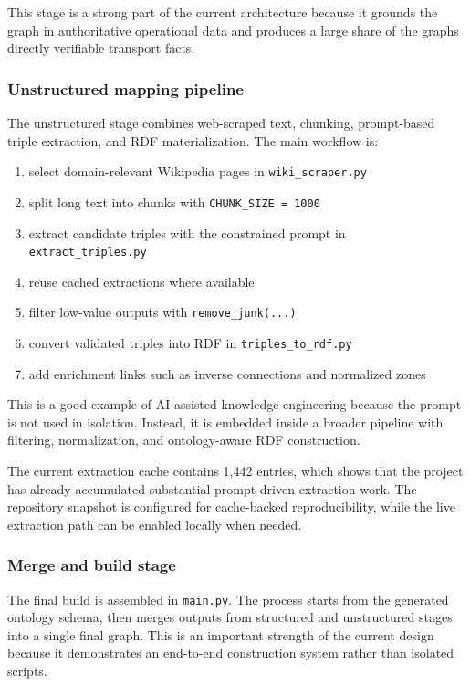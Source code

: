 \documentclass[
  11pt,
  a4paper,
]{article}
\providecommand{\tightlist}{%
  \setlength{\itemsep}{0pt}\setlength{\parskip}{0pt}}
\begin{document}
This stage is a strong part of the current architecture because it
grounds the graph in authoritative operational data and produces a large
share of the graph\textquotesingle s directly verifiable transport
facts.

\subsubsection{Unstructured mapping
pipeline}\label{unstructured-mapping-pipeline}

The unstructured stage combines web-scraped text, chunking, prompt-based
triple extraction, and RDF materialization. The main workflow is:

\begin{enumerate}
\def\labelenumi{\arabic{enumi}.}
\tightlist
\item
  select domain-relevant Wikipedia pages in \texttt{wiki\_scraper.py}
\item
  split long text into chunks with \texttt{CHUNK\_SIZE\ =\ 1000}
\item
  extract candidate triples with the constrained prompt in
  \texttt{extract\_triples.py}
\item
  reuse cached extractions where available
\item
  filter low-value outputs with \texttt{remove\_junk(...)}
\item
  convert validated triples into RDF in \texttt{triples\_to\_rdf.py}
\item
  add enrichment links such as inverse connections and normalized zones
\end{enumerate}

This is a good example of AI-assisted knowledge engineering because the
prompt is not used in isolation. Instead, it is embedded inside a
broader pipeline with filtering, normalization, and ontology-aware RDF
construction.

The current extraction cache contains 1,442 entries, which shows that
the project has already accumulated substantial prompt-driven extraction
work. The repository snapshot is configured for cache-backed
reproducibility, while the live extraction path can be enabled locally
when needed.

\subsubsection{Merge and build stage}\label{merge-and-build-stage}

The final build is assembled in \texttt{main.py}. The process starts
from the generated ontology schema, then merges outputs from structured
and unstructured stages into a single final graph. This is an important
strength of the current design because it demonstrates an end-to-end
construction system rather than isolated scripts.
\end{document}
